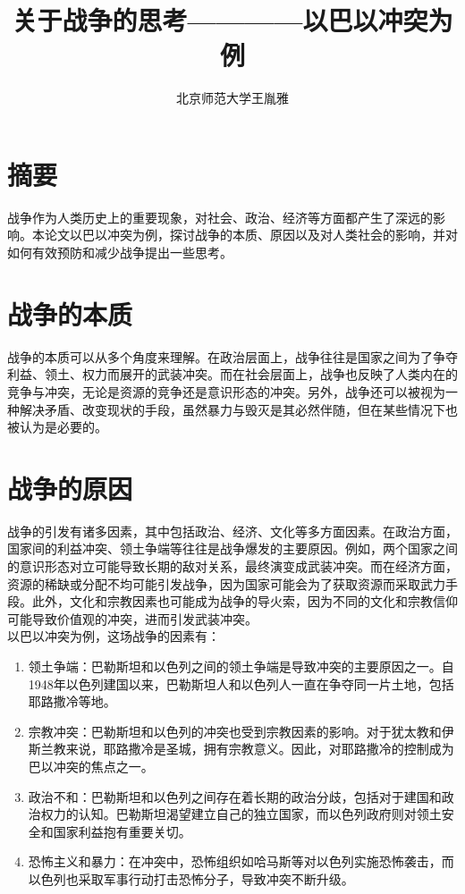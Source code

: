 \documentclass{ctexart}
\title{关于战争的思考————以巴以冲突为例}
\author{北京师范大学\quad 王胤雅\quad 201911010205}
\begin{document}
\large
{}
\maketitle
\section{摘要}
战争作为人类历史上的重要现象，对社会、政治、经济等方面都产生了深远的影响。本论文以巴以冲突为例，探讨战争的本质、原因以及对人类社会的影响，并对如何有效预防和减少战争提出一些思考。

\section{战争的本质}
战争的本质可以从多个角度来理解。在政治层面上，战争往往是国家之间为了争夺利益、领土、权力而展开的武装冲突。而在社会层面上，战争也反映了人类内在的竞争与冲突，无论是资源的竞争还是意识形态的冲突。另外，战争还可以被视为一种解决矛盾、改变现状的手段，虽然暴力与毁灭是其必然伴随，但在某些情况下也被认为是必要的。
\section{战争的原因}
战争的引发有诸多因素，其中包括政治、经济、文化等多方面因素。在政治方面，国家间的利益冲突、领土争端等往往是战争爆发的主要原因。例如，两个国家之间的意识形态对立可能导致长期的敌对关系，最终演变成武装冲突。而在经济方面，资源的稀缺或分配不均可能引发战争，因为国家可能会为了获取资源而采取武力手段。此外，文化和宗教因素也可能成为战争的导火索，因为不同的文化和宗教信仰可能导致价值观的冲突，进而引发武装冲突。\\
以巴以冲突为例，这场战争的因素有：
\begin{enumerate}
  \item 领土争端：巴勒斯坦和以色列之间的领土争端是导致冲突的主要原因之一。自1948年以色列建国以来，巴勒斯坦人和以色列人一直在争夺同一片土地，包括耶路撒冷等地。

  \item 宗教冲突：巴勒斯坦和以色列的冲突也受到宗教因素的影响。对于犹太教和伊斯兰教来说，耶路撒冷是圣城，拥有宗教意义。因此，对耶路撒冷的控制成为巴以冲突的焦点之一。

  \item 政治不和：巴勒斯坦和以色列之间存在着长期的政治分歧，包括对于建国和政治权力的认知。巴勒斯坦渴望建立自己的独立国家，而以色列政府则对领土安全和国家利益抱有重要关切。

  \item 恐怖主义和暴力：在冲突中，恐怖组织如哈马斯等对以色列实施恐怖袭击，而以色列也采取军事行动打击恐怖分子，导致冲突不断升级。
\end{enumerate}
\end{document}
